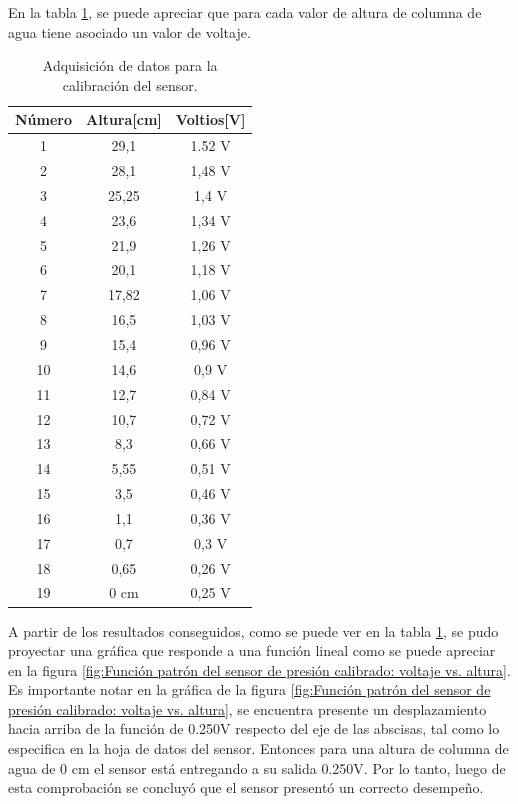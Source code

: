 En la tabla \ref{tab:calibración del sensor-función patrón}, se puede apreciar que para cada valor de altura de columna de agua tiene asociado un valor de voltaje.  
\begin{table}[htpb]
	\centering
	\caption[Adquisición de datos para la calibración del sensor]{Adquisición de datos para la calibración del sensor.}
	\begin{tabular}{c c c}    
		\toprule
		\textbf{Número}     & \textbf{Altura[cm]} & \textbf{Voltios[V]} \\
		\midrule
		1  & 29,1          &  1.52 V \\		
		2  & 28,1          &  1,48 V \\
		3  & 25,25         &  1,4 V \\
		4  & 23,6          &  1,34 V \\
		5  & 21,9          & 1,26 V \\
		6  & 20,1          & 1,18 V \\
		7  & 17,82         & 1,06 V \\
		8  & 16,5          & 1,03 V \\
		9  & 15,4          & 0,96 V \\
		10 & 14,6          & 0,9 V \\
		11 & 12,7          & 0,84 V \\
		12 & 10,7          & 0,72 V \\
		13 & 8,3           & 0,66  V \\
		14 & 5,55          & 0,51 V \\
		15 & 3,5           & 0,46 V \\
		16 & 1,1           & 0,36 V \\
		17 & 0,7           & 0,3 V \\
		18 & 0,65          & 0,26 V \\
		19 & 0 cm          & 0,25 V \\
	
		\bottomrule
		\hline
	\end{tabular}
	\label{tab:calibración del sensor-función patrón}
\end{table}
A partir de los resultados conseguidos, como se puede ver en la tabla \ref{tab:calibración del sensor-función patrón}, se pudo proyectar una gráfica que responde a una función lineal como se puede apreciar en la figura \ref{fig:Función patrón del sensor de presión calibrado: voltaje vs. altura}. 
Es importante notar en la gráfica de la figura \ref{fig:Función patrón del sensor de presión calibrado: voltaje vs. altura}, se encuentra presente un desplazamiento hacia arriba de la función de 0.250V respecto del eje de las abscisas, tal como lo especifica en la hoja de datos del sensor. Entonces para una altura de columna de agua de 0 cm el sensor está entregando a su salida 0.250V. 
Por lo tanto, luego de esta comprobación se concluyó que el sensor presentó un correcto desempeño.

